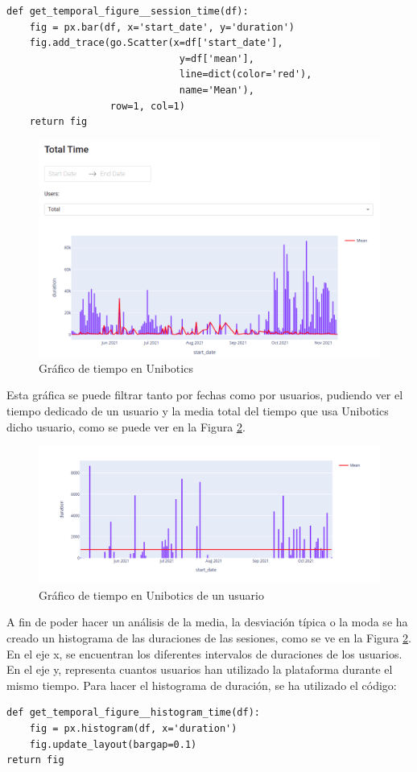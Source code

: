 \begin{verbatim}
def get_temporal_figure__session_time(df):
    fig = px.bar(df, x='start_date', y='duration')
    fig.add_trace(go.Scatter(x=df['start_date'], 
                              y=df['mean'], 
                              line=dict(color='red'), 
                              name='Mean'),
                  row=1, col=1)
    return fig
\end{verbatim}

\begin{figure}[H]
    \centering
    \includegraphics[width=16cm, keepaspectratio]{img/time.png}
    \caption{Gráfico de tiempo en Unibotics}
    \label{fig:time}
\end{figure}
Esta gráfica se puede filtrar tanto por fechas como por usuarios, pudiendo ver el tiempo dedicado de un usuario y la media total del tiempo que usa Unibotics dicho usuario, como se puede ver en la Figura \ref{fig:time_user}.

\begin{figure}[H]
    \centering
    \includegraphics[width=14cm, keepaspectratio]{img/time_user.png}
    \caption{Gráfico de tiempo en Unibotics de un usuario}
    \label{fig:time_user}
\end{figure}
\newpage
A fin de poder hacer un análisis de la media, la desviación típica o la moda se ha creado un histograma de las duraciones de las sesiones, como se ve en la Figura \ref{fig:time_user}. En el eje x, se encuentran los diferentes intervalos de duraciones de los usuarios. En el eje y, representa cuantos usuarios han utilizado la plataforma durante el mismo tiempo. Para hacer el histograma de duración, se ha utilizado el código:
\begin{verbatim}
def get_temporal_figure__histogram_time(df):
    fig = px.histogram(df, x='duration')
    fig.update_layout(bargap=0.1)
return fig
\end{verbatim}


